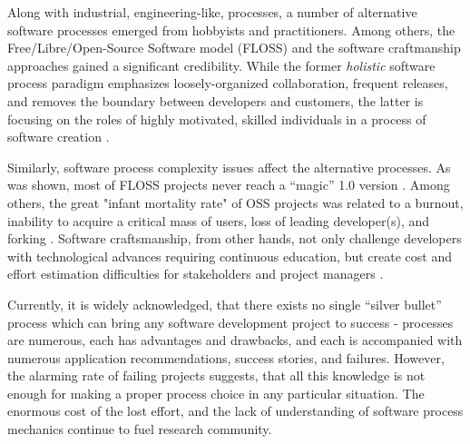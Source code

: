 Along with industrial, engineering-like, processes, a number of alternative software processes emerged from hobbyists
and practitioners. Among others, the Free/Libre/Open-Source Software model (FLOSS) and the software craftmanship  
approaches gained a significant credibility. While the former \textit{holistic} software process paradigm emphasizes
loosely-organized collaboration, frequent releases, and removes the boundary between developers and customers, 
the latter is focusing on the roles of highly motivated, skilled individuals in a process of software creation
\cite{citeulike:262020} \cite{citeulike:2759198}. 

Similarly, software process complexity issues affect the alternative processes. As was shown, most of FLOSS projects 
never reach a ``magic'' 1.0 version \cite{citeulike:12480029}. Among others, the great "infant mortality rate" of OSS
projects was related to a burnout, inability to acquire a critical mass of users, loss of leading developer(s), and
forking \cite{richter2007critique}. Software craftsmanship, from other hands, not only challenge developers
with technological advances requiring continuous education, but create cost and effort estimation difficulties for
stakeholders and project managers \cite{citeulike:11058784}.


Currently, it is widely acknowledged, that there exists no single ``silver bullet'' process \cite{citeulike:1986013}
which can bring any software development project to success - processes are numerous, each has advantages and
drawbacks, and each is accompanied with numerous application recommendations, success stories, and 
failures. However, the alarming rate of failing projects suggests, that all this knowledge is not enough for making 
a proper process choice in any particular situation. The enormous cost of the lost effort, and the lack of understanding 
of software process mechanics continue to fuel research community. 

